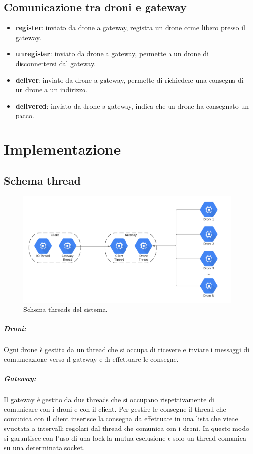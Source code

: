 \documentclass[a4paper,12pt]{report}
\begin{document}
\section{Comunicazione tra droni e gateway}
\begin{itemize}
    \item \textbf{register}: inviato da drone a gateway, registra un drone come libero presso il gateway.
    \item \textbf{unregister}: inviato da drone a gateway, permette a un drone di disconnettersi dal gateway.
    \item \textbf{deliver}: inviato da drone a gateway, permette di richiedere una consegna di un drone a un indirizzo.
    \item \textbf{delivered}: inviato da drone a gateway, indica che un drone ha consegnato un pacco.
\end{itemize}

\chapter{Implementazione}
\section{Schema thread}
\begin{figure}[H]
	\centering{}
	\includegraphics[width=\textwidth]{img/threads.pdf}
	\caption{Schema threads del sistema.}
	\label{img:scheletro}
\end{figure}

\paragraph*{Droni:} Ogni drone è gestito da un thread che si occupa di ricevere e inviare i messaggi di comunicazione verso il gateway e di effettuare le consegne.
\paragraph*{Gateway:} Il gateway è gestito da due threads che si occupano rispettivamente di comunicare con i droni e con il client. Per gestire le consegne il thread che comunica
con il client inserisce la consegna da effettuare in una lista che viene svuotata a intervalli regolari dal thread che comunica con i droni. In questo modo
si garantisce con l'uso di una lock la mutua esclusione e solo un thread comunica su una determinata socket.
\end{document}
